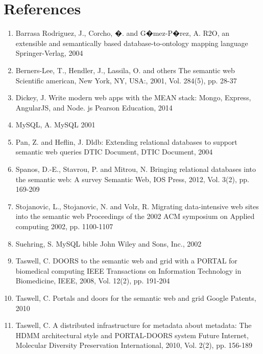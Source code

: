 \documentclass[10pt,twocolumn,twoside]{article}
\begin{document}
\section*{References}
\begin{enumerate}
\item Barrasa Rodriguez, J., Corcho, �. and G�mez-P�rez, A.
R2O, an extensible and semantically based database-to-ontology mapping language
Springer-Verlag, 2004
\item Berners-Lee, T., Hendler, J., Lassila, O. and others
The semantic web
Scientific american, New York, NY, USA:, 2001, Vol. 284(5), pp. 28-37
\item Dickey, J.
Write modern web apps with the MEAN stack: Mongo, Express, AngularJS, and Node. js
Pearson Education, 2014
\item MySQL, A.
MySQL
2001
\item Pan, Z. and Heflin, J.
Dldb: Extending relational databases to support semantic web queries
DTIC Document, DTIC Document, 2004
\item Spanos, D.-E., Stavrou, P. and Mitrou, N.
Bringing relational databases into the semantic web: A survey
Semantic Web, IOS Press, 2012, Vol. 3(2), pp. 169-209
\item Stojanovic, L., Stojanovic, N. and Volz, R.
Migrating data-intensive web sites into the semantic web
Proceedings of the 2002 ACM symposium on Applied computing
2002, pp. 1100-1107
\item Suehring, S.
MySQL bible
John Wiley and Sons, Inc., 2002
\item Taswell, C.
DOORS to the semantic web and grid with a PORTAL for biomedical computing
IEEE Transactions on Information Technology in Biomedicine, IEEE, 2008, Vol. 12(2), pp. 191-204
\item Taswell, C.
Portals and doors for the semantic web and grid
Google Patents, 2010
\item Taswell, C.
A distributed infrastructure for metadata about metadata: The HDMM architectural style and PORTAL-DOORS system
Future Internet, Molecular Diversity Preservation International, 2010, Vol. 2(2), pp. 156-189
\end{enumerate}


\nocite{*}


\end{document}
